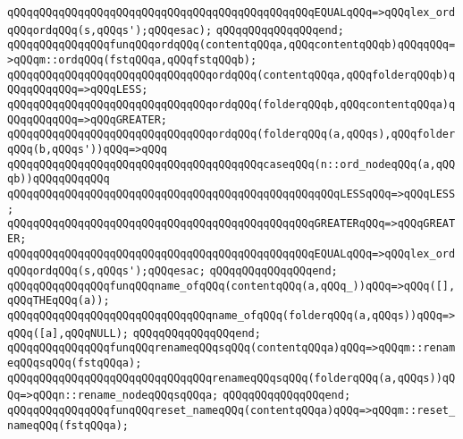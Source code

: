 \verb|qQQqqQQqqQQqqQQqqQQqqQQqqQQqqQQqqQQqqQQqqQQqqQQqEQUALqQQq=>qQQqlex_ordqQQqordqQQq(s,qQQqs');qQQqesac);|\newline
\verb|qQQqqQQqqQQqqQQqend;|\newline
\newline
\verb|qQQqqQQqqQQqqQQqfunqQQqordqQQq(contentqQQqa,qQQqcontentqQQqb)qQQqqQQq=>qQQqm::ordqQQq(fstqQQqa,qQQqfstqQQqb);|\newline
\verb|qQQqqQQqqQQqqQQqqQQqqQQqqQQqqQQqordqQQq(contentqQQqa,qQQqfolderqQQqb)qQQqqQQqqQQq=>qQQqLESS;|\newline
\verb|qQQqqQQqqQQqqQQqqQQqqQQqqQQqqQQqordqQQq(folderqQQqb,qQQqcontentqQQqa)qQQqqQQqqQQq=>qQQqGREATER;|\newline
\verb|qQQqqQQqqQQqqQQqqQQqqQQqqQQqqQQqordqQQq(folderqQQq(a,qQQqs),qQQqfolderqQQq(b,qQQqs'))qQQq=>qQQq|\newline
\verb|qQQqqQQqqQQqqQQqqQQqqQQqqQQqqQQqqQQqqQQqcaseqQQq(n::ord_nodeqQQq(a,qQQqb))qQQqqQQqqQQq|\newline
\verb|qQQqqQQqqQQqqQQqqQQqqQQqqQQqqQQqqQQqqQQqqQQqqQQqqQQqLESSqQQq=>qQQqLESS;|\newline
\verb|qQQqqQQqqQQqqQQqqQQqqQQqqQQqqQQqqQQqqQQqqQQqqQQqGREATERqQQq=>qQQqGREATER;|\newline
\verb|qQQqqQQqqQQqqQQqqQQqqQQqqQQqqQQqqQQqqQQqqQQqqQQqEQUALqQQq=>qQQqlex_ordqQQqordqQQq(s,qQQqs');qQQqesac;|\newline
\verb|qQQqqQQqqQQqqQQqend;|\newline
\newline
\verb|qQQqqQQqqQQqqQQqfunqQQqname_ofqQQq(contentqQQq(a,qQQq_))qQQq=>qQQq([],qQQqTHEqQQq(a));|\newline
\verb|qQQqqQQqqQQqqQQqqQQqqQQqqQQqqQQqname_ofqQQq(folderqQQq(a,qQQqs))qQQq=>qQQq([a],qQQqNULL);|\newline
\verb|qQQqqQQqqQQqqQQqend;|\newline
\newline
\newline
\newline
\verb|qQQqqQQqqQQqqQQqfunqQQqrenameqQQqsqQQq(contentqQQqa)qQQq=>qQQqm::renameqQQqsqQQq(fstqQQqa);|\newline
\verb|qQQqqQQqqQQqqQQqqQQqqQQqqQQqqQQqrenameqQQqsqQQq(folderqQQq(a,qQQqs))qQQq=>qQQqn::rename_nodeqQQqsqQQqa;|\newline
\verb|qQQqqQQqqQQqqQQqend;|\newline
\newline
\verb|qQQqqQQqqQQqqQQqfunqQQqreset_nameqQQq(contentqQQqa)qQQq=>qQQqm::reset_nameqQQq(fstqQQqa);|\newline
